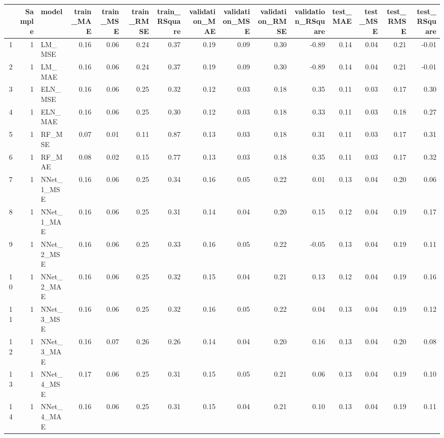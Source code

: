 \begin{table}[ht]
\centering
\begin{tabular}{rrlrrrrrrrrrrrr}
  \hline
 & Sample & model & train\_MAE & train\_MSE & train\_RMSE & train\_RSquare & validation\_MAE & validation\_MSE & validation\_RMSE & validation\_RSquare & test\_MAE & test\_MSE & test\_RMSE & test\_RSquare \\ 
  \hline
1 &   1 & LM\_MSE & 0.16 & 0.06 & 0.24 & 0.37 & 0.19 & 0.09 & 0.30 & -0.89 & 0.14 & 0.04 & 0.21 & -0.01 \\ 
  2 &   1 & LM\_MAE & 0.16 & 0.06 & 0.24 & 0.37 & 0.19 & 0.09 & 0.30 & -0.89 & 0.14 & 0.04 & 0.21 & -0.01 \\ 
  3 &   1 & ELN\_MSE & 0.16 & 0.06 & 0.25 & 0.32 & 0.12 & 0.03 & 0.18 & 0.35 & 0.11 & 0.03 & 0.17 & 0.30 \\ 
  4 &   1 & ELN\_MAE & 0.16 & 0.06 & 0.25 & 0.30 & 0.12 & 0.03 & 0.18 & 0.33 & 0.11 & 0.03 & 0.18 & 0.27 \\ 
  5 &   1 & RF\_MSE & 0.07 & 0.01 & 0.11 & 0.87 & 0.13 & 0.03 & 0.18 & 0.31 & 0.11 & 0.03 & 0.17 & 0.31 \\ 
  6 &   1 & RF\_MAE & 0.08 & 0.02 & 0.15 & 0.77 & 0.13 & 0.03 & 0.18 & 0.35 & 0.11 & 0.03 & 0.17 & 0.32 \\ 
  7 &   1 & NNet\_1\_MSE & 0.16 & 0.06 & 0.25 & 0.34 & 0.16 & 0.05 & 0.22 & 0.01 & 0.13 & 0.04 & 0.20 & 0.06 \\ 
  8 &   1 & NNet\_1\_MAE & 0.16 & 0.06 & 0.25 & 0.31 & 0.14 & 0.04 & 0.20 & 0.15 & 0.12 & 0.04 & 0.19 & 0.17 \\ 
  9 &   1 & NNet\_2\_MSE & 0.16 & 0.06 & 0.25 & 0.33 & 0.16 & 0.05 & 0.22 & -0.05 & 0.13 & 0.04 & 0.19 & 0.11 \\ 
  10 &   1 & NNet\_2\_MAE & 0.16 & 0.06 & 0.25 & 0.32 & 0.15 & 0.04 & 0.21 & 0.13 & 0.12 & 0.04 & 0.19 & 0.16 \\ 
  11 &   1 & NNet\_3\_MSE & 0.16 & 0.06 & 0.25 & 0.32 & 0.16 & 0.05 & 0.22 & 0.04 & 0.13 & 0.04 & 0.19 & 0.12 \\ 
  12 &   1 & NNet\_3\_MAE & 0.16 & 0.07 & 0.26 & 0.26 & 0.14 & 0.04 & 0.20 & 0.16 & 0.13 & 0.04 & 0.20 & 0.08 \\ 
  13 &   1 & NNet\_4\_MSE & 0.17 & 0.06 & 0.25 & 0.31 & 0.15 & 0.05 & 0.21 & 0.06 & 0.13 & 0.04 & 0.19 & 0.10 \\ 
  14 &   1 & NNet\_4\_MAE & 0.16 & 0.06 & 0.25 & 0.31 & 0.15 & 0.04 & 0.21 & 0.10 & 0.13 & 0.04 & 0.19 & 0.11 \\ 

\end{tabular}
\end{table}
